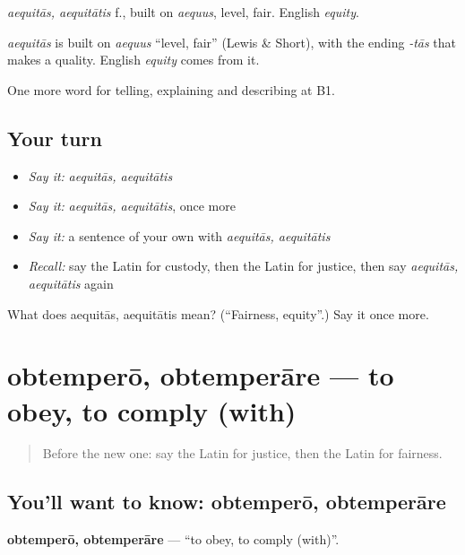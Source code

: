 \emph{aequitās, aequitātis} f., built on \emph{aequus}, level, fair. English \emph{equity}.

\begin{cousinweb}
\emph{aequitās} is built on \emph{aequus} \textquotedblleft{}level, fair\textquotedblright{} (Lewis \& Short), with the ending \emph{-tās} that makes a quality. English \emph{equity} comes from it.
\end{cousinweb}

\begin{grammarlens}[title={What you've built}]
One more word for telling, explaining and describing at B1.
\end{grammarlens}

\subsection*{Your turn}
\begin{itemize}
\raggedright
  \item \emph{Say it:} \emph{aequitās, aequitātis}
  \item \emph{Say it:} \emph{aequitās, aequitātis}, once more
  \item \emph{Say it:} a sentence of your own with \emph{aequitās, aequitātis}
  \item \emph{Recall:} say the Latin for custody, then the Latin for justice, then say \emph{aequitās, aequitātis} again
\end{itemize}

\begin{tcolorbox}[breakable,colback=teal!4,colframe=teal!35!black,title={Before you move on}]
What does aequitās, aequitātis mean? (\textquotedblleft{}Fairness, equity\textquotedblright{}.) Say it once more.
\end{tcolorbox}
\section[obtemperō, obtemperāre]{obtemperō, obtemperāre — to obey, to comply (with)}

\label{lesson:LA-C416-obtempero}



\begin{quote}
Before the new one: say the Latin for justice, then the Latin for fairness.
\end{quote}

\subsection*{You'll want to know: obtemperō, obtemperāre}
\textbf{obtemperō, obtemperāre} — \textquotedblleft{}to obey, to comply (with)\textquotedblright{}.

